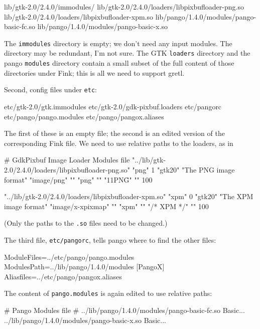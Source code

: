\documentclass{article}
\begin{document}
\begin{code}
lib/gtk-2.0/2.4.0/immodules/
lib/gtk-2.0/2.4.0/loaders/libpixbufloader-png.so
lib/gtk-2.0/2.4.0/loaders/libpixbufloader-xpm.so
lib/pango/1.4.0/modules/pango-basic-fc.so  
lib/pango/1.4.0/modules/pango-basic-x.so
\end{code}

The \texttt{immodules} directory is empty; we don't need any input
modules.  The directory may be redundant, I'm not sure.  The GTK
\texttt{loaders} directory and the pango \texttt{modules} directory
contain a small subset of the full content of those directories under
Fink; this is all we need to support gretl. 

Second, config files under \texttt{etc}:

\begin{code}
etc/gtk-2.0/gtk.immodules
etc/gtk-2.0/gdk-pixbuf.loaders
etc/pangorc
etc/pango/pango.modules
etc/pango/pangox.aliases
\end{code}

The first of these is an empty file; the second is an edited
version of the corresponding Fink file.  We need to use relative
paths to the loaders, as in

\begin{code}
# GdkPixbuf Image Loader Modules file
"../lib/gtk-2.0/2.4.0/loaders/libpixbufloader-png.so"
"png" 1 "gtk20" "The PNG image format"
"image/png" ""
"png" ""
"\211PNG\r\n{}\n" "" 100

"../lib/gtk-2.0/2.4.0/loaders/libpixbufloader-xpm.so"
"xpm" 0 "gtk20" "The XPM image format"
"image/x-xpixmap" ""
"xpm" ""
"/* XPM */" "" 100
\end{code}

(Only the paths to the \texttt{.so} files need to be changed.)

The third file, \texttt{etc/pangorc}, tells pango where to find the
other files:

\begin{code}
[Pango]
ModuleFiles=../etc/pango/pango.modules
ModulesPath=../lib/pango/1.4.0/modules
[PangoX]
Aliasfiles=../etc/pango/pangox.aliases
\end{code}

The content of \texttt{pango.modules} is again edited
to use relative paths:

\begin{code}
# Pango Modules file
#
../lib/pango/1.4.0/modules/pango-basic-fc.so Basic...
../lib/pango/1.4.0/modules/pango-basic-x.so Basic...
\end{code}
\end{document}
